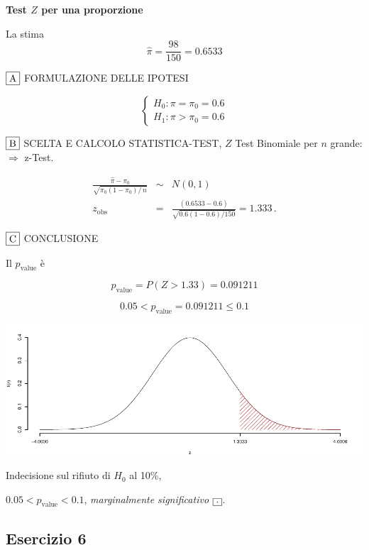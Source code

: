 \documentclass[
  11pt,
]{book}
\theoremstyle{mytheoremstyle}
\theoremstyle{mydefstyle}
\newenvironment{sol}
  {
  \begin{tcolorbox}[enhanced,breakable,arc=0.1mm,boxrule=1pt,colback=white,colframe=iblue,
  title=\bf \fontfamily{lmss}\selectfont \hspace{.5 cm} Soluzione,drop fuzzy shadow]

}{
\end{tcolorbox}
  }
\begin{document}
\begin{sol}
\textbf{Test \(Z\) per una proporzione}

La stima
\[\hat\pi=\frac { 98 } { 150 }= 0.6533  \]

\(\fbox{A}\) FORMULAZIONE DELLE IPOTESI

\[\begin{cases}
   H_0: \pi = \pi_0=0.6 \\
   H_1: \pi > \pi_0=0.6 
   \end{cases}\]

\(\fbox{B}\) SCELTA E CALCOLO STATISTICA-TEST, \(Z\)
Test Binomiale per \(n\) grande: \(\Rightarrow\) z-Test.

\begin{eqnarray*}
   \frac{\hat\pi - \pi_{0}} {\sqrt {\pi_0(1-\pi_0)/\,n}}&\sim&N(0,1)\\
   z_{\text{obs}}
   &=& \frac{ ( 0.6533 -  0.6 )} {\sqrt{ 0.6 (1- 0.6 )/ 150 }}
   =   1.333 \,.
   \end{eqnarray*}

\(\fbox{C}\) CONCLUSIONE

Il \(p_{\text{value}}\) è

\[ p_{\text{value}} = P(Z>1.33)=0.091211 \]

\[
 0.05 < p_\text{value}= 0.091211 \leq 0.1 
\]

\begin{center}\includegraphics{Esami_passati_con_soluzioni_files/figure-latex/3.5b-1} \end{center}

Indecisione sul rifiuto di \(H_0\) al 10\%,

\(0.05<p_\text{value}<0.1\), \emph{marginalmente significativo} \(\fbox{.}\).

\end{sol}

\subsection{Esercizio 6}\label{esercizio-6-40}
\end{document}
